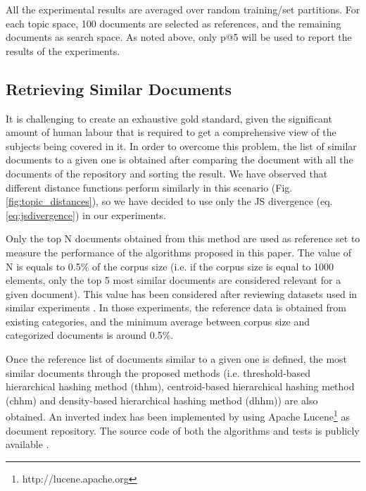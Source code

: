 All the experimental results are averaged over random training/set partitions. For each topic space, 100 documents are selected as references, and the remaining documents as search space. As noted above, only p@5 will be used to report the results of the experiments.

\subsection{Retrieving Similar Documents}
\label{sec:comparison-search}

It is challenging to create an exhaustive gold standard, given the significant amount of human labour that is required to get a comprehensive view of the subjects being covered in it. In order to overcome this problem, the list of similar documents to a given one is obtained after comparing the document with all the documents of the repository and sorting the result. We have observed that different distance functions perform similarly in this scenario (Fig. \ref{fig:topic_distances}), so we have decided to use only the JS divergence (eq. \ref{eq:jsdivergence}) in our experiments.

Only the top N documents obtained from this method are used as reference set to measure the performance of the algorithms proposed in this paper. The value of N is equals to 0.5\% of the corpus size (i.e. if the corpus size is equal to 1000 elements, only the top 5 most similar documents are considered relevant for a given document). This value has been considered after reviewing datasets used in similar experiments \citep{Krstovski2013a, Mao2017}. In those experiments, the reference data is obtained from existing categories, and the minimum average between corpus size and categorized documents is around 0.5\%. 

Once the reference list of documents similar to a given one is defined, the most similar documents through the proposed methods (i.e. threshold-based hierarchical hashing method (thhm), centroid-based hierarchical hashing method (chhm) and density-based hierarchical hashing method (dhhm)) are also obtained. An inverted index has been implemented by using Apache Lucene\footnote{http://lucene.apache.org} as document repository. The source code of both the algorithms and tests is publicly available \citep{Badenes-Olmedo2019a}. 

